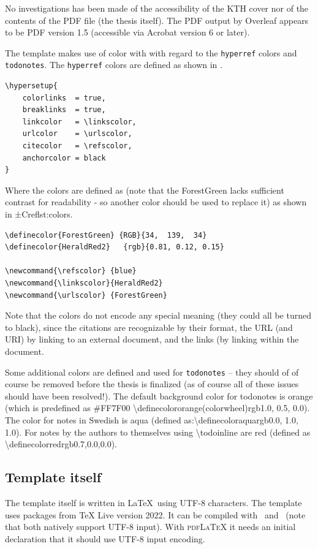 No investigations has been made of the accessibility of the KTH cover nor of the contents of the PDF file (\ie the thesis itself). The PDF output by Overleaf appears to be PDF version 1.5 (\ie accessible via Acrobat version 6 or later).

The template makes use of color with with regard to the \texttt{hyperref} colors and \texttt{todonotes}. The \texttt{hyperref} colors are defined as shown in .
\begin{lstlisting}[language={[LaTeX]TeX}, caption={\textbackslash hypersetup}, label=lst:setupHyperRef]
\hypersetup{
	colorlinks  = true,
	breaklinks  = true,
	linkcolor   = \linkscolor,
	urlcolor    = \urlscolor,
	citecolor   = \refscolor,
	anchorcolor = black
}
\end{lstlisting}
Where the colors are defined as (note that the ForestGreen lacks sufficient contrast for readability - so another color should be used to replace it) as shown in ±Cref{lst:colors}.
\begin{lstlisting}[language={[LaTeX]TeX}, caption={Some colors for hyper references }, label=lst:colors]
\definecolor{ForestGreen} {RGB}{34,  139,  34}
\definecolor{HeraldRed2}   {rgb}{0.81, 0.12, 0.15}

\newcommand{\refscolor} {blue}
\newcommand{\linkscolor}{HeraldRed2}
\newcommand{\urlscolor} {ForestGreen}
\end{lstlisting}

Note that the colors do not encode any special meaning (\ie they could all be turned to black), since the citations are recognizable by their format, the URL (and URI) by linking to an external document, and the links (by linking within the document.

Some additional colors are defined and used for \texttt{todonotes} – they should of of course be removed before the thesis is finalized (as of course all of these issues should have been resolved!). The default background color for todonotes is orange (which is predefined as \#FF7F00 \textbackslash definecolor{orange(colorwheel)}{rgb}{1.0, 0.5, 0.0}). The color for notes in Swedish is aqua (defined as:\textbackslash definecolor{aqua}{rgb}{0.0, 1.0, 1.0}). For notes by the authors to themselves using \textbackslash todoinline are red (defined as \textbackslash definecolor{red}{rgb}{0.7,0.0,0.0}). 

\subsection{Template itself}
\label{sec:ccessibilityOfTemplateItself}
The template itself is written in \LaTeX~using UTF-8 characters. The template uses packages from TeX Live version 2022. It can be compiled with \XeLaTeX\ and \LuaLaTeX\  (note that both natively support UTF-8 input). With \textsc{pdfLaTeX} it needs an initial declaration that it should use UTF-8 input encoding.


